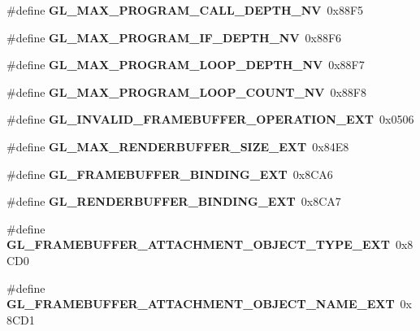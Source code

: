 \begin{DoxyCompactItemize}
\item 
\#define {\bfseries G\+L\+\_\+\+M\+A\+X\+\_\+\+P\+R\+O\+G\+R\+A\+M\+\_\+\+C\+A\+L\+L\+\_\+\+D\+E\+P\+T\+H\+\_\+\+N\+V}~0x88\+F5\label{_s_d_l__opengl_8h_a70f97fd906222a02e7390b29a0c5b301}

\item 
\#define {\bfseries G\+L\+\_\+\+M\+A\+X\+\_\+\+P\+R\+O\+G\+R\+A\+M\+\_\+\+I\+F\+\_\+\+D\+E\+P\+T\+H\+\_\+\+N\+V}~0x88\+F6\label{_s_d_l__opengl_8h_a9f75abc6527c02beb8a5c0c8c47f358b}

\item 
\#define {\bfseries G\+L\+\_\+\+M\+A\+X\+\_\+\+P\+R\+O\+G\+R\+A\+M\+\_\+\+L\+O\+O\+P\+\_\+\+D\+E\+P\+T\+H\+\_\+\+N\+V}~0x88\+F7\label{_s_d_l__opengl_8h_a1207e92618c63aeeffa51a9c5d34e054}

\item 
\#define {\bfseries G\+L\+\_\+\+M\+A\+X\+\_\+\+P\+R\+O\+G\+R\+A\+M\+\_\+\+L\+O\+O\+P\+\_\+\+C\+O\+U\+N\+T\+\_\+\+N\+V}~0x88\+F8\label{_s_d_l__opengl_8h_a96cfd13625808759850c0c9b6aa7ebb8}

\item 
\#define {\bfseries G\+L\+\_\+\+I\+N\+V\+A\+L\+I\+D\+\_\+\+F\+R\+A\+M\+E\+B\+U\+F\+F\+E\+R\+\_\+\+O\+P\+E\+R\+A\+T\+I\+O\+N\+\_\+\+E\+X\+T}~0x0506\label{_s_d_l__opengl_8h_a40e4302481280dfea42fefe95f8a4946}

\item 
\#define {\bfseries G\+L\+\_\+\+M\+A\+X\+\_\+\+R\+E\+N\+D\+E\+R\+B\+U\+F\+F\+E\+R\+\_\+\+S\+I\+Z\+E\+\_\+\+E\+X\+T}~0x84\+E8\label{_s_d_l__opengl_8h_a473758b67779f4b4e6f319f3693a5387}

\item 
\#define {\bfseries G\+L\+\_\+\+F\+R\+A\+M\+E\+B\+U\+F\+F\+E\+R\+\_\+\+B\+I\+N\+D\+I\+N\+G\+\_\+\+E\+X\+T}~0x8\+C\+A6\label{_s_d_l__opengl_8h_aa2f842365229a5a10fdafc445dadf777}

\item 
\#define {\bfseries G\+L\+\_\+\+R\+E\+N\+D\+E\+R\+B\+U\+F\+F\+E\+R\+\_\+\+B\+I\+N\+D\+I\+N\+G\+\_\+\+E\+X\+T}~0x8\+C\+A7\label{_s_d_l__opengl_8h_a639b760af8be828ef3c99dcc0577db70}

\item 
\#define {\bfseries G\+L\+\_\+\+F\+R\+A\+M\+E\+B\+U\+F\+F\+E\+R\+\_\+\+A\+T\+T\+A\+C\+H\+M\+E\+N\+T\+\_\+\+O\+B\+J\+E\+C\+T\+\_\+\+T\+Y\+P\+E\+\_\+\+E\+X\+T}~0x8\+C\+D0\label{_s_d_l__opengl_8h_a57188ec3e667a0ff2e4295b18bf9c011}

\item 
\#define {\bfseries G\+L\+\_\+\+F\+R\+A\+M\+E\+B\+U\+F\+F\+E\+R\+\_\+\+A\+T\+T\+A\+C\+H\+M\+E\+N\+T\+\_\+\+O\+B\+J\+E\+C\+T\+\_\+\+N\+A\+M\+E\+\_\+\+E\+X\+T}~0x8\+C\+D1\label{_s_d_l__opengl_8h_aea11419a9b191790fe3414b6f329535c}


\end{DoxyCompactItemize}
